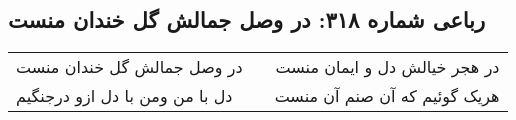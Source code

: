 \begin{center}
\section*{رباعی شماره ۳۱۸: در وصل جمالش گل خندان منست}
\label{sec:0318}
\begin{longtable}{l p{0.5cm} r}
در وصل جمالش گل خندان منست
&&
در هجر خیالش دل و ایمان منست
\\
دل با من ومن با دل ازو درجنگیم
&&
هریک گوئیم که آن صنم آن منست
\\
\end{longtable}
\end{center}
